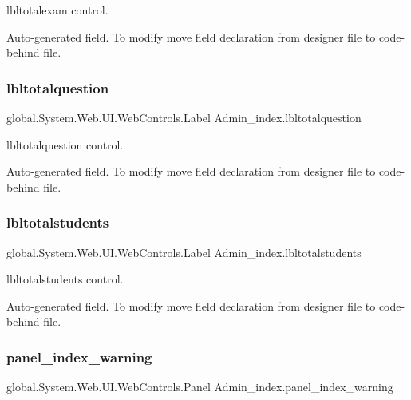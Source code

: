 lbltotalexam control. 

Auto-\/generated field. To modify move field declaration from designer file to code-\/behind file. \mbox{\label{class_admin__index_ad7e65082009e2aee0af9bf2514a9323c}} 
\subsubsection{\texorpdfstring{lbltotalquestion}{lbltotalquestion}}
{\footnotesize\ttfamily global.\+System.\+Web.\+U\+I.\+Web\+Controls.\+Label Admin\+\_\+index.\+lbltotalquestion\hspace{0.3cm}{\ttfamily [protected]}}



lbltotalquestion control. 

Auto-\/generated field. To modify move field declaration from designer file to code-\/behind file. \mbox{\label{class_admin__index_a42fd08404cbe066afeae670d1f41eb31}} 
\subsubsection{\texorpdfstring{lbltotalstudents}{lbltotalstudents}}
{\footnotesize\ttfamily global.\+System.\+Web.\+U\+I.\+Web\+Controls.\+Label Admin\+\_\+index.\+lbltotalstudents\hspace{0.3cm}{\ttfamily [protected]}}



lbltotalstudents control. 

Auto-\/generated field. To modify move field declaration from designer file to code-\/behind file. \mbox{\label{class_admin__index_a87cb3af0be98046e085bae062b96e1f7}} 
\subsubsection{\texorpdfstring{panel\_index\_warning}{panel\_index\_warning}}
{\footnotesize\ttfamily global.\+System.\+Web.\+U\+I.\+Web\+Controls.\+Panel Admin\+\_\+index.\+panel\+\_\+index\+\_\+warning\hspace{0.3cm}{\ttfamily [protected]}}



